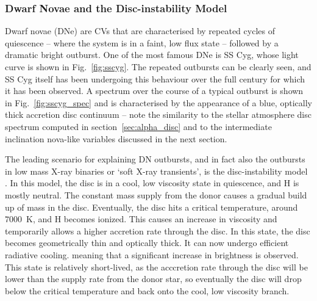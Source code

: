 \subsubsection{Dwarf Novae and the Disc-instability Model}

Dwarf novae (DNe) are CVs that are characterised 
by repeated cycles of quiescence -- 
where the system is in a faint, low flux state --   
followed by a dramatic bright outburst. One of the 
most famous DNe is SS Cyg, whose light curve is shown in 
Fig.~\ref{fig:sscyg}. The repeated outbursts can be clearly seen, and
SS Cyg itself has been undergoing this behaviour over the full century 
for which it has been observed. A spectrum over the course of a 
typical outburst is shown in Fig.~\ref{fig:sscyg_spec} 
and is characterised by the appearance of a blue, optically thick
accretion disc continuum -- note the similarity to the 
stellar atmosphere disc spectrum computed in section~\ref{sec:alpha_disc}
and to the intermediate inclination nova-like variables discussed in the next
section.

The leading scenario for explaining DN outbursts, and in fact also the outbursts
in low mass X-ray binaries or `soft X-ray transients',
is the disc-instability model \citep[DIM; ][]{osaki1974,hoshi1979,meyer1981,lasota2001}. 
In this model, the disc is in a cool, low viscosity state in quiescence, 
and H is mostly neutral. The constant mass supply from the donor causes 
a gradual build up of mass in the disc. Eventually, the disc hits a critical 
temperature, around $7000$~K, and H becomes ionized. This causes an increase
in viscosity and temporarily allows a higher accretion rate through the disc.
In this state, the disc becomes geometrically thin and
optically thick. It can now undergo efficient radiative cooling.
meaning that a significant increase in brightness is observed.
This state is relatively short-lived, as the acccretion rate through
the disc will be lower than the supply rate from the donor star, so eventually
the disc will drop below the critical temperature and back onto the cool,
low viscosity branch. 

